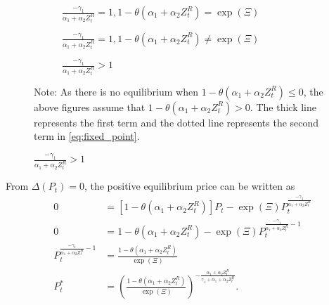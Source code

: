 \documentclass[11pt, a4paper]{article}
\begin{document}
\begin{figure}[!ht]
    \vspace{1em}
    \begin{subfigure}{0.45\textwidth}
         \caption{$\frac{-\gamma_1}{\alpha_1 + \alpha_2 Z^{R}_{t}} = 1, 1-\theta(\alpha_1+\alpha_2 Z_t^R) = \exp(\Xi) $}
         \label{fig:fixed_coinside}
    \end{subfigure}
    \hfill
    \begin{subfigure}{0.45\textwidth}
         \caption{$\frac{-\gamma_1}{\alpha_1 + \alpha_2 Z^{R}_{t}} = 1, 1-\theta(\alpha_1+\alpha_2 Z_t^R) \ne \exp(\Xi) $}
         \label{fig:fixed_parallel}
    \end{subfigure}
    \vspace{1em}
    \begin{subfigure}{0.4\textwidth}
         \caption{$\frac{-\gamma_1}{\alpha_1 + \alpha_2 Z^{R}_{t}}> 1$}
         \label{fig:fixed_convex}
    \end{subfigure}
    
    \footnotesize
    Note: As there is no equilibrium when $1- \theta(\alpha_1 + \alpha_2 Z^{R}_{t}) \le 0$, the above figures assume that $1- \theta(\alpha_1 + \alpha_2 Z^{R}_{t}) > 0$.
    The thick line represents the first term and the dotted line represents the second term in \eqref{eq:fixed_point}.
\end{figure}


From $\Delta (P_t) = 0$, the positive equilibrium price can be written as 
\begin{align}
    0 & = [1-\theta(\alpha_1 + \alpha_2 Z^{R}_{t})]P_t - \exp(\Xi) P_t^{\frac{-\gamma_1}{\alpha_1 + \alpha_2 Z^{R}_{t}}}\nonumber \\ 
    0 & = 1-\theta(\alpha_1 + \alpha_2 Z^{R}_{t}) - \exp(\Xi)P_t^{\frac{-\gamma_1}{\alpha_1 + \alpha_2 Z^{R}_{t}}- 1} \nonumber\\ 
    P_t^{\frac{-\gamma_1}{\alpha_1 + \alpha_2 Z^{R}_{t}}- 1} & = \frac{1-\theta(\alpha_1 + \alpha_2 Z^{R}_{t})}{ \exp(\Xi)}\nonumber\\ 
    P_{t}^* &= \left(\frac{1-\theta(\alpha_1 + \alpha_2 Z^{R}_{t})}{\exp(\Xi)}\right)^{-\frac{\alpha_1 + \alpha_2 Z^{R}_{t}}{\gamma_1 +\alpha_1 + \alpha_2 Z^{R}_{t}}}.
\end{align} 
\end{document}
